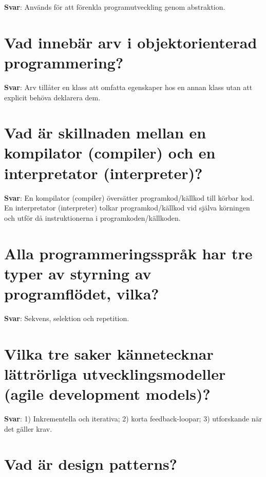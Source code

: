 \documentclass[a4paper,11pt,oneside]{book}
\begin{document}
\begin{sloppypar}
\label{q:218:sa:sv:True}

\textbf{Svar}: Anv\"ands f\"or att f\"orenkla programutveckling genom abstraktion.



\section{Vad inneb\"ar arv i objektorienterad programmering?}

\label{q:219:sa:sv:True}

\textbf{Svar}: Arv till\r{a}ter en klass att omfatta egenskaper hos en annan klass utan att explicit beh\"ova deklarera dem.



\section{Vad \"ar skillnaden mellan en kompilator (compiler) och en interpretator (interpreter)?}

\label{q:220:sa:sv:True}

\textbf{Svar}: En kompilator (compiler) \"overs\"atter programkod/k\"allkod till k\"orbar kod. En interpretator (interpreter) tolkar programkod/k\"allkod vid sj\"alva k\"orningen och utf\"or d\r{a} instruktionerna i programkoden/k\"allkoden.



\section{Alla programmeringsspr\r{a}k har tre typer av styrning av programfl\"odet, vilka?}

\label{q:221:sa:sv:True}

\textbf{Svar}: Sekvens, selektion och repetition.



\section{Vilka tre saker k\"annetecknar l\"attr\"orliga utvecklingsmodeller (agile development models)?}

\label{q:222:sa:sv:True}

\textbf{Svar}: 1) Inkrementella och iterativa; 2) korta feedback-loopar; 3) utforskande n\"ar det g\"aller krav.



\section{Vad \"ar design patterns?}


\end{sloppypar}
\end{document}
